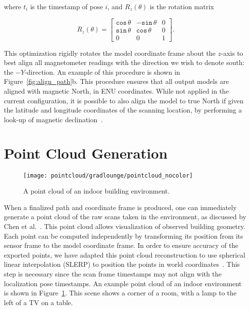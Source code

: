 \documentclass[12pt,onecolumn,oneside]{book}
\begin{document}
\noindent where $t_i$ is the timestamp of pose $i$, and $R_{z}(\theta)$ is the rotation matrix

\begin{equation}
	\label{eq:rotation_matrix}
	R_{z}(\theta) = \left[ \begin{array}{ccc}
				\texttt{cos}\,\theta & -\texttt{sin}\,\theta & 0 \\
				\texttt{sin}\,\theta & \texttt{cos}\,\theta & 0 \\
				0 & 0 & 1 \end{array} \right].
\end{equation}

\noindent This optimization rigidly rotates the model coordinate frame about the $z$-axis to best align all magnetometer readings with the direction we wish to denote south:  the $-Y$-direction.  An example of this procedure is shown in Figure~\ref{fig:align_path}b.  This procedure ensures that all output models are aligned with magnetic North, in ENU coordinates.  While not applied in the current configuration, it is possible to also align the model to true North if given the latitude and longitude coordinates of the scanning location, by performing a look-up of magnetic declination~\cite{MagDec}.

\section{Point Cloud Generation}
\label{sec:pointcloud}

\begin{figure}
	\centerline{\texttt{[image: pointcloud/gradlounge/pointcloud\_nocolor]}}
	\caption{A point cloud of an indoor building environment.}
	\label{fig:pointcloud_nocolor}
\end{figure}

When a finalized path and coordinate frame is produced, one can immediately generate a point cloud of the raw scans taken in the environment, as discussed by Chen et al.~\cite{Backpack}.  This point cloud allows visualization of observed building geometry.  Each point can be computed independently by transforming its position from its sensor frame to the model coordinate frame.  In order to ensure accuracy of the exported points, we have adapted this point cloud reconstruction to use spherical linear interpolation (SLERP) to position the points in world coordinates~\cite{slerp}.  This step is necessary since the scan frame timestamps may not align with the localization pose timestamps.  An example point cloud of an indoor environment is shown in Figure~\ref{fig:pointcloud_nocolor}.  This scene shows a corner of a room, with a lamp to the left of a TV on a table.
\end{document}
